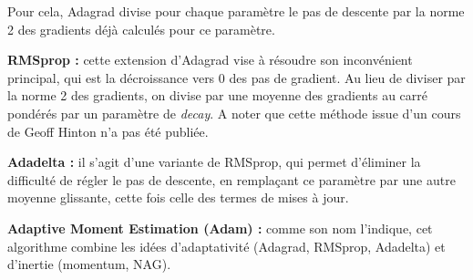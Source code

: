 \documentclass[12 pt, a4paper]{article}
\theoremstyle{definition}
\begin{document}
Pour cela, Adagrad divise pour chaque paramètre le pas de descente par la norme 2 des gradients déjà calculés pour ce paramètre. 

\vspace{0.5cm}

\textbf{RMSprop :} cette extension d'Adagrad vise à résoudre son inconvénient principal, qui est la décroissance vers 0 des pas de gradient. Au lieu de diviser par la norme 2 des gradients, on divise par une moyenne des gradients au carré pondérés par un paramètre de \textit{decay}. A noter que cette méthode issue d'un cours de Geoff Hinton n'a pas été publiée.

\vspace{0.5cm}

\textbf{Adadelta :} il s'agit d'une variante de RMSprop, qui permet d'éliminer la difficulté de régler le pas de descente, en remplaçant ce paramètre par une autre moyenne glissante, cette fois celle des termes de mises à jour.

\vspace{0.5cm}

\textbf{Adaptive Moment Estimation (Adam) :} comme son nom l'indique, cet algorithme combine les idées d'adaptativité (Adagrad, RMSprop, Adadelta) et d'inertie (momentum, NAG).
\end{document}
